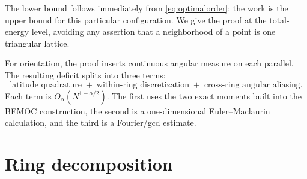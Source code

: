 \documentclass[11pt]{amsart}
\begin{document}
The lower bound follows immediately from \eqref{eq:optimalorder}; the work
is the upper bound for this particular configuration.  We give the proof at
the total-energy level, avoiding any assertion that a neighborhood of a
point is one triangular lattice.

For orientation, the proof inserts continuous angular measure on each
parallel.  The resulting deficit splits into three terms:
\[
 \boxed{\text{latitude quadrature}}
 \; +\; \boxed{\text{within-ring discretization}}
 \; +\; \boxed{\text{cross-ring angular aliasing}}.
\]
Each term is $O_\alpha(N^{1-\alpha/2})$.  The first uses the two exact
moments built into the BEMOC construction, the second is a one-dimensional
Euler--Maclaurin calculation, and the third is a Fourier/gcd estimate.

\section{Ring decomposition}
\end{document}
